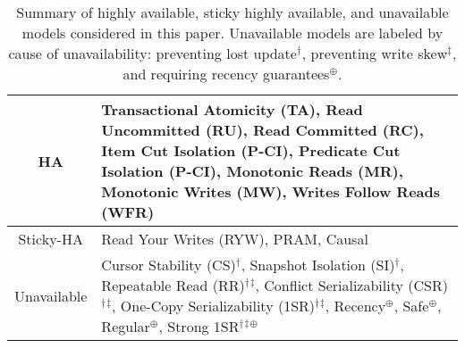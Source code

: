  \newcommand{\lostupdate}{$^\dagger$}
 \newcommand{\rwskew}{$^\ddagger$}
 \newcommand{\linearizable}{$^\oplus$}

\begin{table}
\begin{tabular}{| c | p{6cm} | }\hline
HA & Transactional Atomicity (TA), Read Uncommitted (RU), Read
Committed (RC), Item Cut Isolation (P-CI), Predicate Cut Isolation
(P-CI), Monotonic Reads (MR), Monotonic Writes (MW), Writes Follow
Reads (WFR)\\\hline Sticky-HA & Read Your Writes (RYW), PRAM,
Causal\\\hline Unavailable & Cursor Stability (CS)\lostupdate,
Snapshot Isolation (SI)\lostupdate, Repeatable Read
(RR)\lostupdate\rwskew, Conflict Serializability
(CSR)\lostupdate\rwskew, One-Copy Serializability
(1SR)\lostupdate\rwskew, Recency\linearizable, Safe\linearizable,
Regular\linearizable, Strong 1SR\lostupdate\rwskew\linearizable
\\\hline
\end{tabular}
\caption{Summary of highly available, sticky highly available, and
  unavailable models considered in this paper. Unavailable models are
  labeled by cause of unavailability: preventing lost
  update\lostupdate, preventing write skew\rwskew, and requiring
  recency guarantees\linearizable.}
\label{table:hatcompared}
\end{table}

